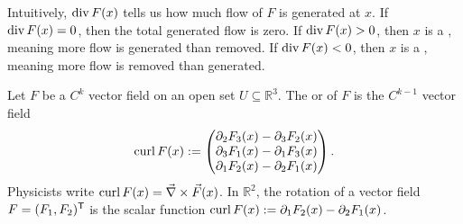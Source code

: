 \begin{remark}
Intuitively, $\operatorname{div} F(x)$ tells us how much flow of $F$ is generated at $x$. If $\operatorname{div} F(x) = 0$, then the total generated flow is zero.
If $\operatorname{div} F(x) > 0$, then $x$ is a  , meaning more flow is generated than removed.
If $\operatorname{div} F(x) < 0$, then $x$ is a  , meaning more flow is removed than generated.

\begin{center}
\end{center}
\end{remark}

\begin{definition}
\label{def:rotation}
Let $F$ be a $C^k$ vector field on an open set $U \subseteq \mathbb{R}^3$. The  or  of $F$ is the $C^{k-1}$ vector field
\[\operatorname{curl} F(x) := \begin{pmatrix} \partial_2 F_3(x) - \partial_3 F_2(x) \\ \partial_3 F_1(x) - \partial_1 F_3(x) \\ \partial_1 F_2(x) - \partial_2 F_1(x) \end{pmatrix}.\]
Physicists write $\operatorname{curl} F(x) = \vec{\nabla} \times \vec{F}(x)$.
In $\mathbb{R}^2$, the rotation of a vector field $F = (F_1, F_2)^{\mathsf{T}}$ is the scalar function $\operatorname{curl} F(x) := \partial_1 F_2(x) - \partial_2 F_1(x)$.
\end{definition}

